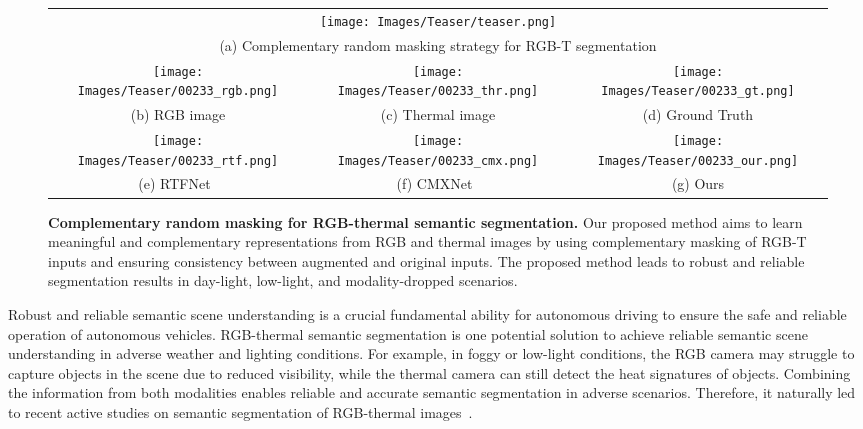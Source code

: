 \documentclass[10pt,twocolumn,letterpaper]{article}
\begin{document}
\begin{figure}[t]
\begin{center}
{
\begin{tabular}{c@{\hskip 0.005\linewidth}c@{\hskip 0.005\linewidth}c}
\multicolumn{3}{c}{\texttt{[image: Images/Teaser/teaser.png]}} \\ 
\multicolumn{3}{c}{{\footnotesize (a) Complementary random masking strategy for RGB-T segmentation}} \\  \texttt{[image: Images/Teaser/00233\_rgb.png]} &
\texttt{[image: Images/Teaser/00233\_thr.png]} &
\texttt{[image: Images/Teaser/00233\_gt.png]} \\ 
{\footnotesize (b) RGB image } & {\footnotesize (c) Thermal image } & {\footnotesize (d) Ground Truth} \\ \texttt{[image: Images/Teaser/00233\_rtf.png]} &
\texttt{[image: Images/Teaser/00233\_cmx.png]} &
\texttt{[image: Images/Teaser/00233\_our.png]} \\
{\footnotesize (e) RTFNet~\cite{sun2019rtfnet}} & {\footnotesize (f) CMXNet~\cite{liu2022cmx}} & {\footnotesize (g) Ours} \\
\end{tabular}
}
\end{center}
\vspace{-0.2in}
\caption{{\bf Complementary random masking for RGB-thermal semantic segmentation.}
Our proposed method aims to learn meaningful and complementary representations from RGB and thermal images by using complementary masking of RGB-T inputs and ensuring consistency between augmented and original inputs. 
The proposed method leads to robust and reliable segmentation results in day-light, low-light, and modality-dropped scenarios.
}
\label{fig:teaser}
\end{figure}
 

Robust and reliable semantic scene understanding is a crucial fundamental ability for autonomous driving to ensure the safe and reliable operation of autonomous vehicles.
RGB-thermal semantic segmentation is one potential solution to achieve reliable semantic scene understanding in adverse weather and lighting conditions.
For example, in foggy or low-light conditions, the RGB camera may struggle to capture objects in the scene due to reduced visibility, while the thermal camera can still detect the heat signatures of objects. 
Combining the information from both modalities enables reliable and accurate semantic segmentation in adverse scenarios.
Therefore, it naturally led to recent active studies on semantic segmentation of RGB-thermal images~\cite{ha2017mfnet,sun2019rtfnet,shivakumar2019pst900,sun2020fuseseg,zhou2021gmnet,kim2021ms,liu2022cmx,zhao2023mitigating}.
\end{document}
